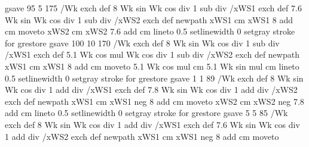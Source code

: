 {{  gsave
     95 5 175 { /Wk exch def
                        {8 Wk sin Wk cos div 1 sub div} /xWS1 exch def
                        {7.6 Wk sin Wk cos div 1 sub div} /xWS2 exch def
                        newpath
                        xWS1 cm xWS1 8 add cm moveto
                        xWS2 cm xWS2 7.6 add cm
                        lineto
                        0.5 setlinewidth
                        0 setgray
                        stroke
                      } for
  grestore
  gsave
    100 10 170 { /Wk exch def
                          {8 Wk sin Wk cos div 1 sub div} /xWS1 exch def
                          {5.1 Wk cos mul  Wk cos div 1 sub div} /xWS2 exch def
                          newpath
                          xWS1 cm xWS1 8 add cm moveto
                         5.1 Wk cos mul cm 5.1 Wk sin mul cm
                         lineto
                         0.5 setlinewidth
                         0 setgray
                        stroke
                     } for
  grestore
  gsave
     1 1 89 { /Wk exch def
                   {8 Wk sin Wk cos div 1 add div} /xWS1 exch def
                   {7.8 Wk sin Wk cos div 1 add div} /xWS2 exch def
                   newpath
                   xWS1 cm xWS1 neg 8 add cm moveto
                   xWS2 cm xWS2 neg 7.8 add cm
                  lineto
                  0.5 setlinewidth
                  0 setgray
                  stroke
               } for
  grestore
  gsave
      5 5 85 { /Wk exch def
                    {8 Wk sin Wk cos div 1 add div} /xWS1 exch def
                    {7.6 Wk sin Wk cos div 1 add div} /xWS2 exch def
                    newpath
                    xWS1 cm xWS1 neg 8 add cm moveto
}}}
